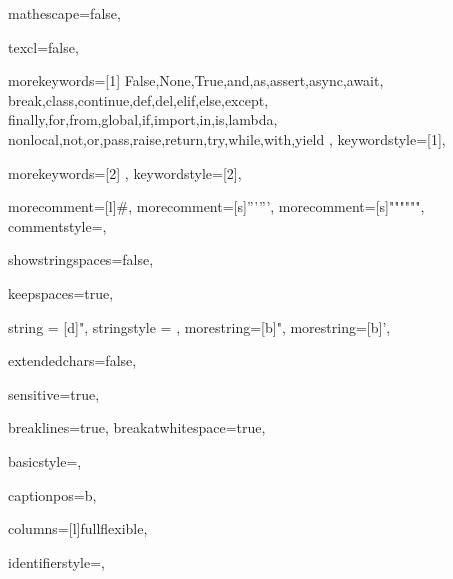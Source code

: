  {

mathescape=false,

texcl=false,

morekeywords=[1]{
False,None,True,and,as,assert,async,await,
break,class,continue,def,del,elif,else,except,
finally,for,from,global,if,import,in,is,lambda,
nonlocal,not,or,pass,raise,return,try,while,with,yield
},
keywordstyle=[1]{\ttfamily\color{RoyalBlue}},

morekeywords=[2]{
},
keywordstyle=[2]{\ttfamily\color{VioletRed}},

morecomment=[l]\#,
morecomment=[s]{'''}{'''},
morecomment=[s]{"""}{"""},
commentstyle={\ttfamily\color{SeaGreen}},

showstringspaces=false,

keepspaces=true,

string = [d]{"},
stringstyle = {\ttfamily\color{FireBrick}},
morestring=[b]",
morestring=[b]',


extendedchars=false,

sensitive=true,

breaklines=true,
breakatwhitespace=true,

basicstyle=\ttfamily\small,

captionpos=b,

columns=[l]fullflexible,

identifierstyle={\ttfamily\color{DarkGray}},

}
